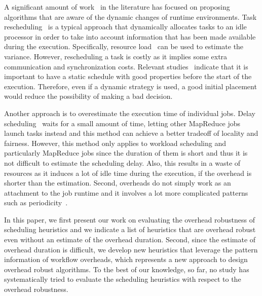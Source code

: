 A significant amount of work~\cite{Ahmad1998, Chetto1990, Dong2010, Yang03} in the literature has focused on proposing algorithms that are aware of the dynamic changes of runtime environments. Task rescheduling~\cite{Sakellariou2004, Zhang2009, Chen2010} is a typical approach that dynamically allocates tasks to an idle processor in order to take into account information that has been made available during the execution. Specifically, resource load~\cite{Dong2010} can be used to estimate the variance. However, rescheduling a task is costly as it implies some extra communication and synchronization costs. Relevant studies~\cite{Sakellariou2004} indicate that it is important to have a static schedule with good properties before the start of the execution. Therefore, even if a dynamic strategy is used, a good initial placement would reduce the possibility of making a bad decision. 

Another approach is to overestimate the execution time of individual jobs. Delay scheduling~\cite{Zaharia10} waits for a small amount of time, letting other MapReduce jobs launch tasks instead and this method can achieve a better tradeoff of locality and fairness. However, this method only applies to workload scheduling and particularly MapReduce jobs since the duration of them is short and thus it is not difficult to estimate the scheduling delay. Also, this results in a waste of resources as it induces a lot of idle time during the execution, if the overhead is shorter than the estimation. Second, overheads do not simply work as an attachment to the job runtime and it involves a lot more complicated patterns such as periodicity~\cite{Chen}. 

In this paper, we first present our work on evaluating the overhead robustness of scheduling heuristics and we indicate a list of heuristics that are overhead robust even without an estimate of the overhead duration. Second, since the estimate of overhead duration is difficult, we develop new heuristics that leverage the pattern information of workflow overheads, which represents a new approach to design overhead robust algorithms. To the best of our knowledge, so far, no study has systematically tried to evaluate the scheduling heuristics with respect to the overhead robustness.  




